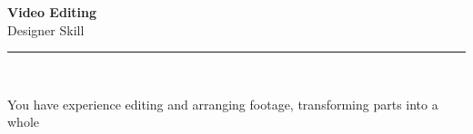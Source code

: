 \documentclass[11pt,a4paper]{memoir}
\begin{document}
    \begin{Spacing}{0.75}%
        \noindent
        \Large
        \textbf{Video Editing}\\[3pt]
        \scriptsize\color{gray}Designer Skill\\ 
        \rule{\textwidth}{.3mm}\\
        
        \vspace{3mm}
        \noindent
        \begin{minipage}[t]{53mm}
            \begin{flushleft}
            {
                \normalsize
                \begin{Spacing}{1}%
                \color{black}\textrm{You have experience editing and arranging footage, transforming parts into a whole}\\
                \end{Spacing}
            }
            \end{flushleft}
        \end{minipage}

        \vspace{5mm}
        \noindent
        \begin{minipage}[t]{53mm}
            \begin{flushleft}
            {
                \normalsize
                \begin{Spacing}{1}%
                \color{gray}\textit{}\\
                \end{Spacing}
            }
            \end{flushleft}
        \end{minipage}
    \end{Spacing}
    \clearpage
\end{document}
